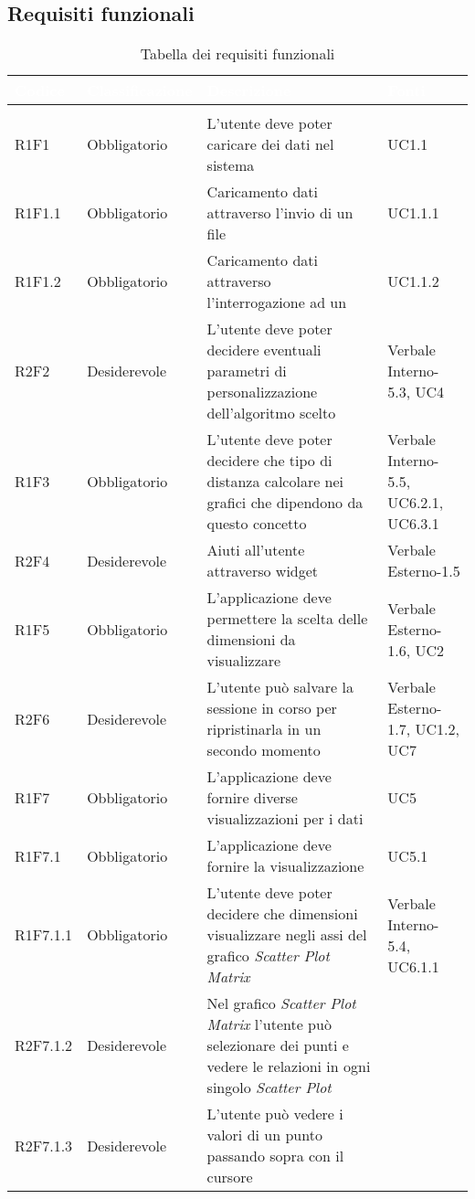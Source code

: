 \subsection{Requisiti funzionali}
\renewcommand{\arraystretch}{1.5}
\begin{center}
\begin{longtable}{C{2cm} | C{3cm} | C{7cm} | C{3.3cm}}
		\textcolor{white}{\textbf{Codice}} & 
		\textcolor{white}{\textbf{Classificazione}} & 
		\textcolor{white}{\textbf{Descrizione}} & 
		\textcolor{white}{\textbf{Fonti}} \\
		\endfirsthead
	    \\
	    \endfoot
	    \caption{Tabella dei requisiti funzionali}
	    \endlastfoot

R1F1 & Obbligatorio & L'utente deve poter caricare dei dati nel sistema & UC1.1\\
R1F1.1 & Obbligatorio & Caricamento dati attraverso l'invio di un file  & UC1.1.1\\
R1F1.2 & Obbligatorio & Caricamento dati attraverso l'interrogazione ad un  & UC1.1.2\\

R2F2 & Desiderevole & L'utente deve poter decidere eventuali parametri di personalizzazione dell'algoritmo scelto & Verbale Interno-5.3, UC4\\

R1F3 & Obbligatorio & L'utente deve poter decidere che tipo di distanza calcolare nei grafici che dipendono da questo concetto & Verbale Interno-5.5, UC6.2.1, UC6.3.1\\

R2F4 & Desiderevole & Aiuti all'utente attraverso widget & Verbale Esterno-1.5 \\
R1F5 & Obbligatorio & L'applicazione deve permettere la scelta delle dimensioni da visualizzare & Verbale Esterno-1.6, UC2\\
R2F6 & Desiderevole & L'utente può salvare la sessione in corso per ripristinarla in un secondo momento & Verbale Esterno-1.7, UC1.2, UC7\\
R1F7 & Obbligatorio & L'applicazione deve fornire diverse visualizzazioni per i dati & UC5\\
R1F7.1 & Obbligatorio & L'applicazione deve fornire la visualizzazione  & UC5.1\\
R1F7.1.1 & Obbligatorio & L'utente deve poter decidere che dimensioni visualizzare negli assi del grafico \textit{Scatter Plot Matrix} & Verbale Interno-5.4, UC6.1.1\\
R2F7.1.2 & Desiderevole & Nel grafico \textit{Scatter Plot Matrix} l'utente può selezionare dei punti e vedere le relazioni in ogni singolo \textit{Scatter Plot} & \\
R2F7.1.3 & Desiderevole & L'utente può vedere i valori di un punto passando sopra con il cursore & \\


\end{longtable}
\end{center}
